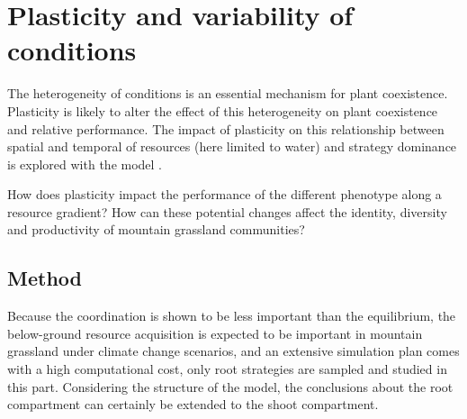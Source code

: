

\section{Plasticity and variability of conditions}
The heterogeneity of conditions is an essential mechanism for plant coexistence. Plasticity is likely to alter the effect of this heterogeneity on plant coexistence and relative performance. The impact of plasticity on this relationship between spatial and temporal  of resources (here limited to water) and strategy dominance is explored with the model \model.

How does plasticity impact the performance of the different phenotype along a resource gradient? How can these potential changes affect the identity, diversity and productivity of mountain grassland communities?



\subsection{Method}

Because the coordination is shown to be less important than the equilibrium, the below-ground resource acquisition is expected to be important in mountain grassland under climate change scenarios, and an extensive simulation plan comes with a high computational cost, only root strategies are sampled and studied in this part. Considering the structure of the model, the conclusions about the root compartment can certainly be extended to the shoot compartment.

